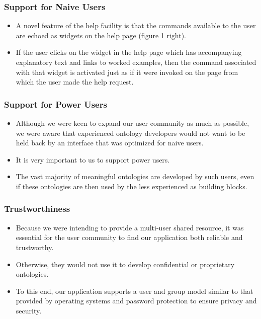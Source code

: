 \documentclass{beamer}
\begin{document}
\begin{frame}
\frametitle{Support for Naive Users}

\begin{itemize}
\item A novel feature of the help facility is that the commands available to the user are echoed as widgets on the help page (figure 1 right).
\item If the user clicks on the widget in the help page which has accompanying explanatory text and links to worked examples, then the command associated with that widget is activated just as if it were invoked on the page from which the user made the help request.
\end{itemize}

\end{frame}

\begin{frame}
\frametitle{Support for Power Users}

\begin{itemize}
\item Although we were keen to expand our user community as much as possible, we were aware that experienced ontology developers would not want to be held back by an interface that was optimized for naive users.
\item It is very important to us to support power users.
\item The vast majority of meaningful ontologies are developed by such users, even if these ontologies are then used by the less experienced as building blocks.
\end{itemize}

\end{frame}

\begin{frame}
\frametitle{Trustworthiness}

\begin{itemize}
\item Because we were intending to provide a multi-user shared resource, it was essential for the user community to find our application both reliable and trustworthy.
\item Otherwise, they would not use it to develop confidential or proprietary ontologies.
\item To this end, our application supports a user and group model similar to that provided by operating systems and password protection to ensure privacy and security.
\end{itemize}

\end{frame}
\end{document}
